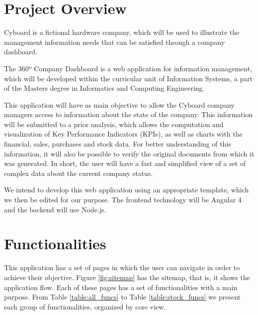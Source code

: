 \documentclass[a4paper]{article}
\begin{document}
\maketitle
\thispagestyle{empty}

\newpage


\section{Project Overview}

Cyboard is a fictional hardware company, which will be used to illustrate the management information needs that can be satisfied through a company dashboard.

The 360º Company Dashboard is a web application for information management, which will be developed within the curricular unit of Information Systems, a part of the Masters degree in Informatics and Computing Engineering.

This application will have as main objective to allow the Cyboard company managers access to information about the state of the company. This information will be submitted to a prior analysis, which allows the computation and visualization of Key Performance Indicators (KPIs), as well as charts with the financial, sales, purchases and stock data. For better understanding of this information, it will also be possible to verify the original documents from which it was generated. In short, the user will have a fast and simplified view of a set of complex data about the current company status.

We intend to develop this web application using an appropriate template, which we then be edited for our purpose. The frontend technology will be Angular 4 and the backend will use Node.js.


\section{Functionalities}

This application has a set of pages in which the user can navigate in order to achieve their objective. Figure \ref{fig:sitemap} has the sitemap, that is, it shows the application flow. Each of these pages has a set of functionalities with a main purpose. From Table \ref{table:all_funcs} to Table \ref{table:stock_funcs} we present each group of functionalities, organized by core view.
\end{document}
